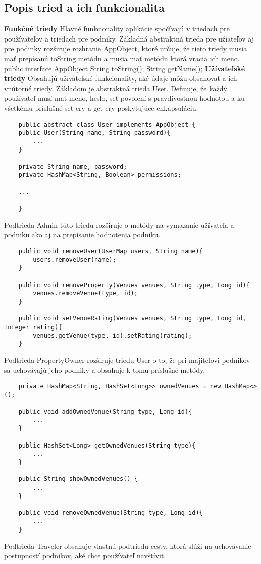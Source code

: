 \documentclass{article}
\begin{document}
\subsection{Popis tried a ich funkcionalita}
\textbf{Funkčné triedy}
Hlavné funkcionality aplikácie spočívajú v triedach pre používateľov a triedach pre podniky. Základná abstraktná trieda pre užíateľov aj pre podinky rozširuje rozhranie AppObject, ktoré určuje, že tieto triedy musia mať prepísanú toString metódu a musia mať metódu ktorá vracia ich meno.
public interface AppObject {
    String toString();
    String getName();
}
\textbf{Užívateľské triedy}
Obsahujú užívateľské funkcionality, aké údaje môžu obsahovať a ich vnútorné triedy.
Základom je abstraktná trieda User. Definuje, že každý používateľ musí mať meno, heslo, set povolení s pravdivostnou hodnotou a ku všetkému príslušné set-ery a get-ery poskytujúce enkapsuláciu. 
\begin{verbatim}
    public abstract class User implements AppObject {
    public User(String name, String password){
        ...
    }

    private String name, password;
    private HashMap<String, Boolean> permissions;

    ...

    }
\end{verbatim}
Podtrieda Admin túto triedu rozširuje o metódy na vymazanie užívateľa a podniku ako aj na prepísanie hodnotenia podniku.
\begin{verbatim}
    public void removeUser(UserMap users, String name){
        users.removeUser(name);
    }

    public void removeProperty(Venues venues, String type, Long id){
        venues.removeVenue(type, id);
    }

    public void setVenueRating(Venues venues, String type, Long id, Integer rating){
        venues.getVenue(type, id).setRating(rating);
    }
\end{verbatim}
Podtrieda PropertyOwner rozširuje triedu User o to, že pri majiteľovi podnikov sa uchovávajú jeho podniky a obsahuje k tomu príslušné metódy.
\begin{verbatim}
    private HashMap<String, HashSet<Long>> ownedVenues = new HashMap<>();

    public void addOwnedVenue(String type, Long id){
        ...
    }

    public HashSet<Long> getOwnedVenues(String type){
        ...
    }

    public String showOwnedVenues() {
        ...
    }

    public void removeOwnedVenue(String type, Long id){
        ...
    }
\end{verbatim}
Podtrieda Traveler obsahuje vlastnú podtriedu cesty, ktorá slúži na uchovávanie postupností podnikov, aké chce používateľ navštíviť.
\end{document}
